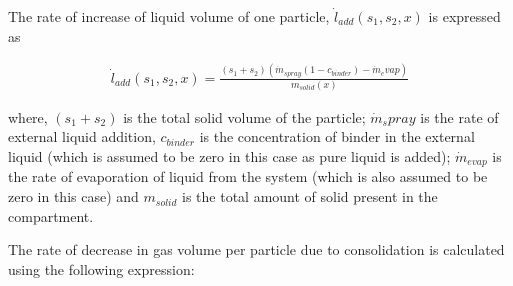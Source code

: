 \documentclass[preprint,11pt,authoryear]{elsarticle}
\begin{document}


%	
%	    
%	    
%	    

\par The rate of increase of liquid volume of one particle, $\dot{l}_{add}(s_1,s_2,x)$ is expressed as

\begin{align}
\dot{l}_{add}(s_1,s_2,x) = \frac{(s_1+s_2)(\dot{m}_{spray}(1-c_{binder})-\dot{m}_evap)}{m_{solid}(x)}
\end{align}

where, $(s_1+s_2)$  is the total solid volume of the particle; $\dot{m}_spray$ is the rate of external 
liquid addition, $c_{binder}$ is the concentration of binder in the external liquid (which is assumed to 
be zero in this case as pure liquid is added); $\dot{m}_{evap}$ is the rate of evaporation of liquid from 
the system (which is also assumed to be zero in this case) and $m_{solid}$ is the total amount of solid 
present in the compartment.
\par The rate of decrease in gas volume per particle due to consolidation is calculated using the 
following expression: 
\end{document}
